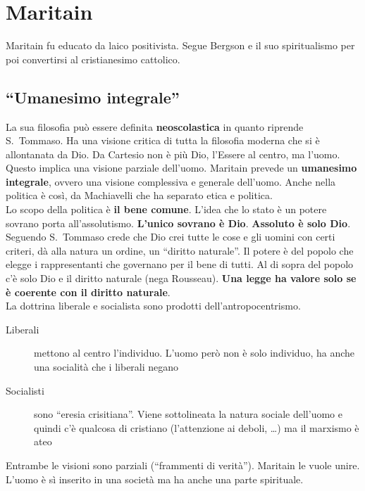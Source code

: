 
\section{Maritain}
Maritain fu educato da laico positivista. Segue Bergson e il suo spiritualismo per poi convertirsi al
cristianesimo cattolico.

\subsection{``Umanesimo integrale''}
La sua filosofia può essere definita \textbf{neoscolastica} in quanto riprende S.~Tommaso. Ha una
visione critica di tutta la filosofia moderna che si è allontanata da Dio. Da Cartesio non è più Dio,
l'Essere al centro, ma l'uomo. Questo implica una visione parziale dell'uomo. Maritain prevede un
\textbf{umanesimo integrale}, ovvero una visione complessiva e generale dell'uomo. Anche nella
politica è così, da Machiavelli che ha separato etica e politica.\\ [\baselineskip]
Lo scopo della politica è \textbf{il bene comune}. L'idea che lo stato è un potere sovrano porta
all'assolutismo. \textbf{L'unico sovrano è Dio}. \textbf{Assoluto è solo Dio}. Seguendo S.~Tommaso
crede che Dio crei tutte le cose e gli uomini con certi criteri, dà alla natura un ordine, un
``diritto naturale''. Il potere è del popolo che elegge i rappresentanti che governano per il bene
di tutti. Al di sopra del popolo c'è solo Dio e il diritto naturale (nega Rousseau). \textbf{Una 
legge ha valore solo se è coerente con il diritto naturale}.\\
La dottrina liberale e socialista sono prodotti dell'antropocentrismo.
\begin{description}
  \item[Liberali] mettono al centro l'individuo. L'uomo però non è solo individuo, ha anche una 
    socialità che i liberali negano
  \item[Socialisti] sono ``eresia crisitiana''. Viene sottolineata la natura sociale dell'uomo e 
    quindi c'è qualcosa di cristiano (l'attenzione ai deboli, \ldots) ma il marxismo è ateo
\end{description}
Entrambe le visioni sono parziali (``frammenti di verità''). Maritain le vuole unire. L'uomo è sì
inserito in una società ma ha anche una parte spirituale.

